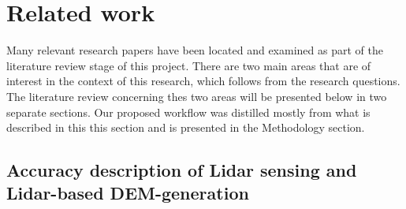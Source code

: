 
\chapter{Related work}
\label{chap:rw}

Many relevant research papers have been located and examined as part of the literature review stage of this project. There are two main areas that are of interest in the context of this research, which follows from the research questions. The literature review concerning thes two areas will be presented below in two separate sections. Our proposed workflow was distilled mostly from what is described in this this section and is presented in the Methodology section.

\section*{Accuracy description of Lidar sensing and Lidar-based DEM-generation}

